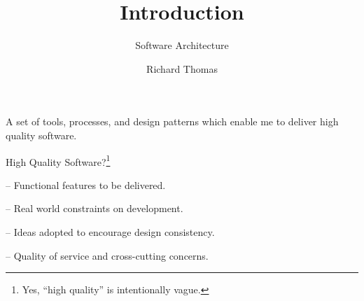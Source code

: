 \documentclass{slide}
\title{Introduction}
\subtitle{Software Architecture}
\institute{University of Queensland}
\author{Richard Thomas}
\date{\week{1}}
\begin{document}
\maketitle







%
{A set of tools, processes, and design patterns which enable me to deliver high quality software.}


\begin{frame}{High Quality Software?\footnote{Yes, ``high quality'' is intentionally vague.}}

\Large{
\begin{description}
    \setlength\itemsep{0.5em}
    \item[Functional Requirements] -- Functional features to be delivered.
    \item[Constraints] -- Real world constraints on development.
    \item[Principles] -- Ideas adopted to encourage design consistency.
    \item[Quality Attributes] -- Quality of service and cross-cutting concerns.
\end{description}
}

\end{frame}
\end{document}
